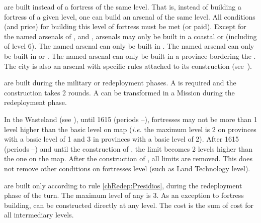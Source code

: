 \aparag[Arsenals]\label{chLogistic:Build Arsenals} are built instead of
a fortress of the same level. That is, instead of building a fortress of a
given level, one can build an arsenal of the same level. All conditions (and
price) for building this level of fortress must be met (or paid).
\bparag Except for the named arsenals of ,
 and , arsenals may
only be built in a coastal \TP or \COL (including \COL of level 6).
\bparag The named arsenal  can only be built in
.
\bparag The named arsenal  can only be built in
 or .
\bparag The named arsenal  can only be built in a
province bordering the \regionNoire.
\bparag The city  is also an arsenal
 with specific rules attached to its
construction (see~).

\aparag[Forts] are built during the military or redeployment phases.
\bparag A \LD is required and the construction takes 2 rounds.
\bparag A \LeaderMis can be transformed in a Mission during the redeployment
phase.

\aparag[Wasteland]\label{chLogistic:Fortresses Wasteland} In the Wasteland (see
), until 1615 (periods --),
fortresses may not be more than 1 level higher than the basic level on map
(\emph{i.e.} the maximum level is 2 on provinces with a basic level of 1 and 3
in provinces with a basic level of 2).
\bparag After 1615 (periods --) and until the
construction of , the limit becomes 2 levels higher
than the one on the map.
\bparag After the construction of , all limits are
removed.
\bparag This does not remove other conditions on fortresses level (such as
Land Technology level).

\aparag[\Presidios] are built only according to rule \ref{chRedep:Presidios},
during the redeployment phase of the turn. The maximum level of any \Presidio
is 3.
\bparag As an exception to fortress building, \Presidio can be constructed
directly at any level. The cost is the sum of cost for all intermediary
levels.

